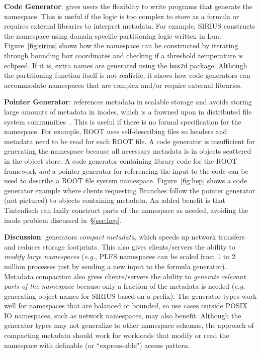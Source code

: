 \textbf{Code Generator}: gives users the flexiblity to write programs that
generate the namespace. This is useful if the logic is too complex to store as
a formula or requires external libraries to interpret metadata. For example,
SIRIUS constructs the namespace using domain-specific partitioning logic
written in Lua.  Figure~\ref{fig:sirius} shows how the namespace can be
constructed by iterating through  bounding box coordinates and checking if a
threshold temperature is eclipsed. If it is, extra names are generated using
the \texttt{box2d} package.  Although the partitioning function itself is not
realistic, it shows how code generators can accommodate namespaces that are
complex and/or require external libraries.  

\textbf{Pointer Generator}: references metadata in scalable storage and avoids
storing large amounts of metadata in inodes, which is a frowned upon in
distributed file system communities~\cite{docs:cephinternals}. This is useful
if there is no formal specification for the namespace. For example, ROOT uses
self-describing files so headers and metadata need to be read for each ROOT
file. A code generator is insufficient for generating the namespace because all
necessary metadata is in objects scattered in the object store.  A code
generator containing library code for the ROOT framework \emph{and} a pointer
generator for referencing the input to the code can be used to describe a ROOT
file system namespace.  Figure~\ref{fig:hep} shows a code generator example
where clients requesting Branches follow the pointer generator (not pictured)
to objects containing metadata. An added benefit is that Tintenfisch can lazily
construct parts of the namespace as needed, avoiding the inode problem
discussed in~\S\ref{sec:hep}.


\textbf{Discussion}: generators \emph{compact metadata}, which speeds up
network transfers and reduces storage footprints. This also gives
clients/servers the ability to \emph{modify large namespaces} ({\it e.g.}, PLFS
namespaces can be scaled from 1 to 2 million processes just by sending a new
input to the formula generator). Metadata compaction also gives clients/servers
the ability to \emph{generate relevant parts of the namespace} because only a
fraction of the metadata is needed ({\it e.g.} generating object names for
SIRIUS based on a prefix).  The generator types work well for namespaces that
are balanced or bounded, so use cases outside POSIX IO namespaces, such as
network namespaces, may also benefit.  Although the generator types may not
generalize to other namespace schemas, the approach of compacting metadata
should work for workloads that modify or read the namespace with definable (or
``express-able") access pattern.  



